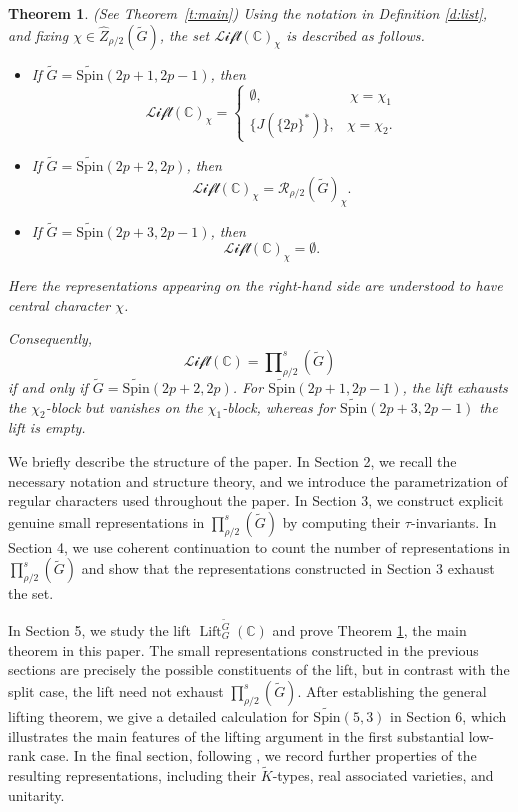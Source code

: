 \documentclass{amsart}
\DeclareMathOperator{\Lift}{Lift}
\newcommand{\LLift}{\mathscr{Lift}}
\newcommand{\bbC}{{\mathbb{C}}}
\newcommand{\Spin}{{\mathrm{Spin}}}
\newtheorem{thm}{Theorem}[section]
\theoremstyle{definition}
\newcommand{\calR}{{\mathcal{R}}}
\newcommand{\tu}{\widetilde}
\begin{document}
\begin{thm} \label{t:main1}\textup{(See Theorem~\ref{t:main})}
Using the notation in Definition \ref{d:list}, and fixing
$\chi\in \widehat Z_{\rho/2}(\tu G)$, the set $\LLift(\bbC)_\chi$ is described
as follows.
\begin{itemize}
    \item[(a)] If $\tu G=\tu{\Spin}(2p+1,2p-1)$, then
    \[
    \LLift(\bbC)_\chi
    =\begin{cases}
        \emptyset, & \ \chi =\chi_1\\
    \{J(\{2p\}^*)\}, & \chi=\chi_2.
    \end{cases}
    \]

    \item[(b)] If $\tu G=\tu{\Spin}(2p+2,2p)$, then
    \[
    \LLift(\bbC)_\chi
    =
    \calR_{\rho/2}(\tu G)_\chi.
    \]

    \item[(c)] If $\tu G=\tu{\Spin}(2p+3,2p-1)$, then
    \[
    \LLift(\bbC)_\chi
    =
    \emptyset.
    \]
\end{itemize}
Here the representations appearing on the right-hand side are understood to
have central character $\chi$.


Consequently,
\[
\LLift(\bbC)
=
\prod\nolimits_{\rho/2}^{s}(\widetilde G)
\]
if and only if
\(\widetilde G=\widetilde{\Spin}(2p+2,2p)\).
For \(\widetilde{\Spin}(2p+1,2p-1)\), the lift exhausts the
\(\chi_2\)-block but vanishes on the \(\chi_1\)-block, whereas for
\(\widetilde{\Spin}(2p+3,2p-1)\) the lift is empty.

\end{thm}



We briefly describe the structure of the paper. In Section 2, we recall the
necessary notation and structure theory, and we introduce the parametrization of
regular characters used throughout the paper. In Section 3, we construct
explicit genuine small representations in
$\prod\nolimits_{\rho/2}^s(\tu G)$
by computing their $\tau$-invariants. In Section 4, we use coherent
continuation to count the number of representations in
$\prod\nolimits_{\rho/2}^s(\tu G)$
and show that the representations constructed in Section 3 exhaust the set.

In Section 5, we study the lift $\Lift_G^{\tu G}(\bbC)$ and prove Theorem
\ref{t:main1}, the main theorem in this paper. The small representations constructed in the previous sections
are precisely the possible constituents of the lift, but in contrast with the
split case, the lift need not exhaust
$\prod\nolimits_{\rho/2}^s(\tu G).$
After establishing the general lifting theorem, we give a detailed
calculation for \(\tu{\Spin}(5,3)\) in Section 6, which illustrates the main features
of the lifting argument in the first substantial low-rank case.  In the
final section, following \cite{BTs18}, we record further properties of the resulting
representations, including their  \(\tu K\)-types, real associated
varieties, and unitarity.
\end{document}
